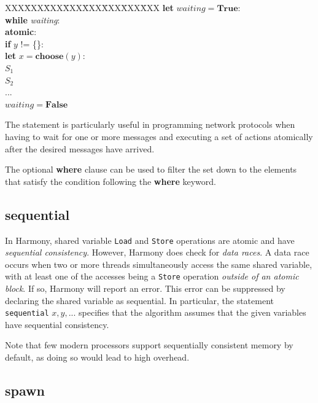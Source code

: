 \documentclass{report}
\newenvironment{code}{
\tcolorbox
}{
\endtcolorbox
}
\begin{document}
\begin{code}
\begin{tabbing}
XXX\=XXX\=XXX\=XXX\=XXX\=XXX\=XXX\=XXX\kill
\>\textbf{let} $\mathit{waiting} = \mathbf{True}:$ \\
\>\>\textbf{while} \textit{waiting}: \\
\>\>\>\textbf{atomic}: \\
\>\>\>\>\textbf{if} $y$ != \{\}:\\
\>\>\>\>\>\textbf{let} $x = \mathbf{choose}(y)$:\\
\>\>\>\>\>\>$S_1$ \\
\>\>\>\>\>\>$S_2$ \\
\>\>\>\>\>\>$...$ \\
\>\>\>\>\>$\mathit{waiting} = \mathbf{False}$
\end{tabbing}
\end{code}

The statement is particularly useful in programming network protocols
when having to wait for one or more messages and executing a set
of actions atomically after the desired messages have arrived.

The optional \textbf{where} clause can be used to filter the set down to the elements
that satisfy the condition following the \textbf{where} keyword.

\subsection*{\textbf{sequential}}

In Harmony, shared variable \texttt{Load} and \texttt{Store} operations
are atomic and have \emph{sequential consistency}.
However, Harmony does check for \emph{data races}.  A data race occurs
when two or more threads simultaneously access the same shared variable,
with at least one of the accesses being a \texttt{Store} operation
\emph{outside of an atomic block}.
If so, Harmony will report an error.  This error can be suppressed by
declaring the shared variable as sequential.  In particular, the statement
\texttt{sequential} $x, y, ...$ specifies that the algorithm assumes
that the given variables have sequential consistency.

Note that few modern processors support sequentially consistent memory
by default, as doing so would lead to high overhead.

\subsection*{\textbf{spawn}}
\end{document}
